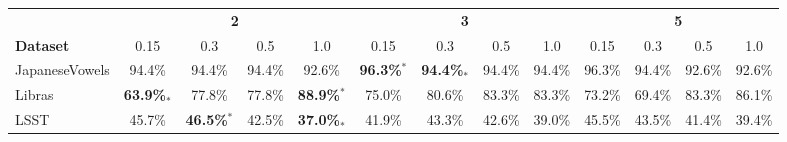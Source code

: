 \begin{tabular}{lcccccccccccc}
\toprule
{} & \multicolumn{4}{c}{\textbf{2}}    & \multicolumn{4}{c}{\textbf{3}}    & \multicolumn{4}{c}{\textbf{5}}  \\
\cmidrule(lr){2-5} \cmidrule(lr){6-9} \cmidrule(lr){10-13}
\textbf{Dataset}          & 0.15   & 0.3    & 0.5    & 1.0    & 0.15   & 0.3    & 0.5    & 1.0    & 0.15   & 0.3    & 0.5    & 1.0 \\
\midrule
JapaneseVowels            & 94.4\% & 94.4\% & 94.4\% & 92.6\% & \textbf{96.3\%}$^*$ & \textbf{94.4\%}$_*$ & 94.4\% & 94.4\% & 96.3\% & 94.4\% & 92.6\% & 92.6\% \\
Libras                    & \textbf{63.9\%}$_*$ & 77.8\% & 77.8\% & \textbf{88.9\%}$^*$ & 75.0\% & 80.6\% & 83.3\% & 83.3\% & 73.2\% & 69.4\% & 83.3\% & 86.1\% \\
LSST                      & 45.7\% & \textbf{46.5\%}$^*$ & 42.5\% & \textbf{37.0\%}$_*$ & 41.9\% & 43.3\% & 42.6\% & 39.0\% & 45.5\% & 43.5\% & 41.4\% & 39.4\% \\
\bottomrule
\end{tabular}
